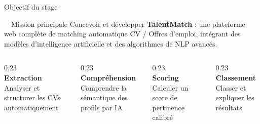 \documentclass[aspectratio=169]{beamer}
\begin{document}
\begin{frame}{Objectif du stage}

  \begin{block}{\faBullseye\ \ Mission principale}
    Concevoir et développer \textbf{TalentMatch} : une plateforme web complète
    de matching automatique CV / Offres d'emploi, intégrant des modèles
    d'intelligence artificielle et des algorithmes de NLP avancés.
  \end{block}

  \vspace{0.4cm}

  \begin{columns}[T]
    \begin{column}{0.23\textwidth}
      \centering
      \textcolor{blue!70!black}{\faFilePdf}\\[4pt]
      \textbf{Extraction}\\
      \small Analyser et structurer les CVs automatiquement
    \end{column}
    \begin{column}{0.23\textwidth}
      \centering
      \textcolor{blue!70!black}{\faBrain}\\[4pt]
      \textbf{Compréhension}\\
      \small Comprendre la sémantique des profils par IA
    \end{column}
    \begin{column}{0.23\textwidth}
      \centering
      \textcolor{blue!70!black}{\faChartBar}\\[4pt]
      \textbf{Scoring}\\
      \small Calculer un score de pertinence calibré
    \end{column}
    \begin{column}{0.23\textwidth}
      \centering
      \textcolor{blue!70!black}{\faListOl}\\[4pt]
      \textbf{Classement}\\
      \small Classer et expliquer les résultats
    \end{column}
  \end{columns}


\end{frame}
\end{document}
